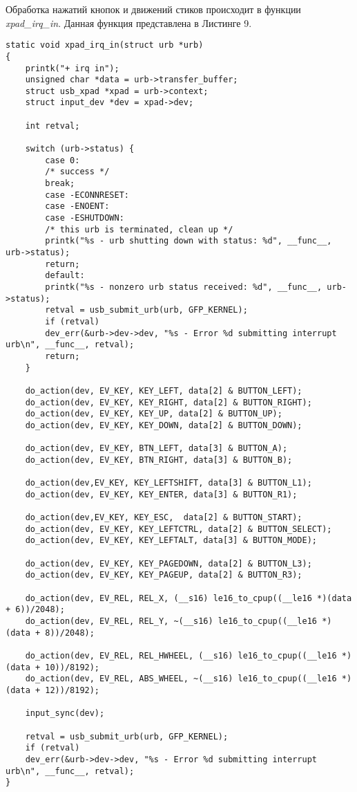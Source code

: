 Обработка нажатий кнопок и движений стиков происходит в функции \textit{xpad\_irq\_in}.
Данная функция представлена в Листинге 9.
 \begin{lstlisting}[caption=Функция xpad\_irq\_in]
static void xpad_irq_in(struct urb *urb)
{
	printk("+ irq in");
	unsigned char *data = urb->transfer_buffer;
	struct usb_xpad *xpad = urb->context;
	struct input_dev *dev = xpad->dev;
	
	int retval;
	
	switch (urb->status) {
		case 0:
		/* success */
		break;
		case -ECONNRESET:
		case -ENOENT:
		case -ESHUTDOWN:
		/* this urb is terminated, clean up */
		printk("%s - urb shutting down with status: %d", __func__, urb->status);
		return;
		default:
		printk("%s - nonzero urb status received: %d", __func__, urb->status);
		retval = usb_submit_urb(urb, GFP_KERNEL);
		if (retval)
		dev_err(&urb->dev->dev, "%s - Error %d submitting interrupt urb\n", __func__, retval);
		return;
	}
	
	do_action(dev, EV_KEY, KEY_LEFT, data[2] & BUTTON_LEFT);
	do_action(dev, EV_KEY, KEY_RIGHT, data[2] & BUTTON_RIGHT);
	do_action(dev, EV_KEY, KEY_UP, data[2] & BUTTON_UP);
	do_action(dev, EV_KEY, KEY_DOWN, data[2] & BUTTON_DOWN);
	
	do_action(dev, EV_KEY, BTN_LEFT, data[3] & BUTTON_A);
	do_action(dev, EV_KEY, BTN_RIGHT, data[3] & BUTTON_B);
	
	do_action(dev,EV_KEY, KEY_LEFTSHIFT, data[3] & BUTTON_L1);
	do_action(dev, EV_KEY, KEY_ENTER, data[3] & BUTTON_R1);
	
	do_action(dev,EV_KEY, KEY_ESC,  data[2] & BUTTON_START);
	do_action(dev, EV_KEY, KEY_LEFTCTRL, data[2] & BUTTON_SELECT);
	do_action(dev, EV_KEY, KEY_LEFTALT, data[3] & BUTTON_MODE);
	
	do_action(dev, EV_KEY, KEY_PAGEDOWN, data[2] & BUTTON_L3);
	do_action(dev, EV_KEY, KEY_PAGEUP, data[2] & BUTTON_R3);
	
	do_action(dev, EV_REL, REL_X, (__s16) le16_to_cpup((__le16 *)(data + 6))/2048);
	do_action(dev, EV_REL, REL_Y, ~(__s16) le16_to_cpup((__le16 *)(data + 8))/2048);
	
	do_action(dev, EV_REL, REL_HWHEEL, (__s16) le16_to_cpup((__le16 *)(data + 10))/8192);
	do_action(dev, EV_REL, ABS_WHEEL, ~(__s16) le16_to_cpup((__le16 *)(data + 12))/8192);
	
	input_sync(dev);
	
	retval = usb_submit_urb(urb, GFP_KERNEL);
	if (retval)
	dev_err(&urb->dev->dev, "%s - Error %d submitting interrupt urb\n", __func__, retval);
}
\end{lstlisting}

